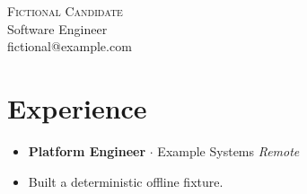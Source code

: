 \documentclass[letterpaper,11pt]{article}
\begin{document}
\begin{center}
  {\Huge\scshape Fictional Candidate}\\[3pt]
  {\large Software Engineer}\\[3pt]
  {\small fictional@example.com}
\end{center}
\section{Experience}
\begin{itemize}
  \item \textbf{Platform Engineer} $\cdot$ Example Systems \textit{Remote}
  \item Built a deterministic offline fixture.
\end{itemize}
\end{document}
